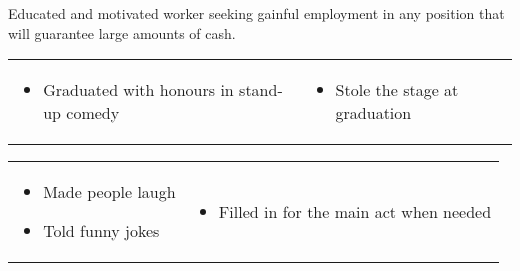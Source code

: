 \documentclass[letterpaper,10pt]{resume}
\begin{document}
\contact{\myfullname}{\myurl}{\myemail}{\myphone}

	\begin{body}
	Educated and motivated worker seeking gainful employment in any position
	that will guarantee large amounts of cash.
	\end{body}

	\begin{body}
		\begin{tabular}{p{} p{}}
			\begin{itemize}
			\item Graduated with honours in stand-up comedy
			\end{itemize}
		&
			\begin{itemize}
			\item Stole the stage at graduation
			\end{itemize}
		\end{tabular}

	\medskip

		\begin{changemargin}{0.2in}{0in}
			\begin{tabular}{p{0.5\textwidth} p{}}
				\begin{itemize}
				\item Made people laugh
				\item Told funny jokes
				\end{itemize}
			&
				\begin{itemize}
				\item Filled in for the main act when needed
				\end{itemize}
			\end{tabular}
		\end{changemargin}
	\end{body}
\end{document}
